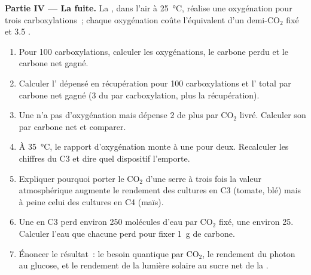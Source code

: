 \begin{problem}
\medskip
\noindent\textbf{Partie IV --- La fuite.}
La , dans l'air à \qty{25}{\celsius}, réalise une oxygénation
pour trois carboxylations~; chaque oxygénation coûte l'équivalent d'un
demi-$\mathrm{CO_2}$ fixé et 3.5 .
\begin{enumerate}[resume]
  \item Pour 100 carboxylations, calculer les oxygénations, le carbone
        perdu et le carbone net gagné.
  \item Calculer l' dépensé en récupération pour 100 carboxylations
        et l' total par carbone net gagné (3  du 
        par carboxylation, plus la récupération).
  \item Une  n'a pas d'oxygénation mais dépense 2  de
        plus par $\mathrm{CO_2}$ livré. Calculer son  par carbone net
        et comparer.
  \item À \qty{35}{\celsius}, le rapport d'oxygénation monte à une pour
        deux. Recalculer les chiffres du C3 et dire quel dispositif
        l'emporte.
  \item Expliquer pourquoi porter le $\mathrm{CO_2}$ d'une serre à trois
        fois la valeur atmosphérique augmente le rendement des cultures
        en C3 (tomate, blé) mais à peine celui des cultures en C4
        (maïs).
  \item Une  en C3 perd environ 250 molécules d'eau par
        $\mathrm{CO_2}$ fixé, une  environ 25. Calculer l'eau
        que chacune perd pour fixer \qty{1}{g} de carbone.
  \item Énoncer le résultat~: le besoin quantique par $\mathrm{CO_2}$,
        le rendement du photon au glucose, et le rendement de la lumière
        solaire au sucre net de la .
\end{enumerate}
\end{problem}
